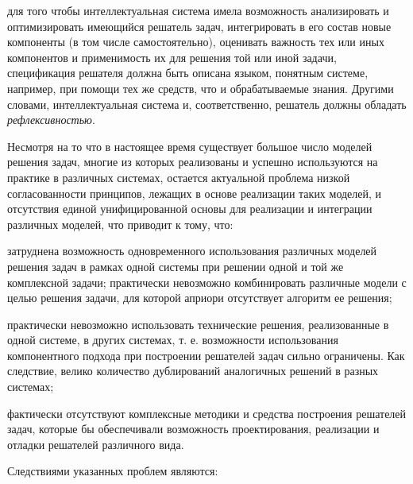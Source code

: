 \begin{textitemize}
	\item для того чтобы интеллектуальная система имела возможность анализировать и оптимизировать имеющийся решатель задач, интегрировать в его состав новые компоненты (в том числе самостоятельно), оценивать важность тех или иных компонентов и применимость их для решения той или иной задачи, спецификация решателя должна быть описана языком, понятным системе, например, при помощи тех же средств, что и обрабатываемые знания. Другими словами, интеллектуальная система и, соответственно, решатель должны обладать \textit{рефлексивностью}.
\end{textitemize}

Несмотря на то что в настоящее время существует большое число моделей решения задач, многие из которых реализованы и успешно используются на практике в различных системах, остается актуальной проблема низкой согласованности принципов, лежащих в основе реализации таких моделей, и отсутствия единой унифицированной основы для реализации и интеграции различных моделей, что приводит к тому, что:

\begin{textitemize}
	\item затруднена возможность одновременного использования различных моделей решения задач в рамках одной системы при решении одной и той же комплексной задачи; практически невозможно комбинировать различные модели с целью решения задачи, для которой априори отсутствует алгоритм ее решения;
	\item практически невозможно использовать технические решения, реализованные в одной системе, в других системах, т. е. возможности использования компонентного подхода при построении решателей задач сильно ограничены. Как следствие, велико количество дублирований аналогичных решений в разных системах;
	\item фактически отсутствуют комплексные методики и средства построения решателей задач, которые бы обеспечивали возможность проектирования, реализации и отладки решателей различного вида.
\end{textitemize}

Следствиями указанных проблем являются:

